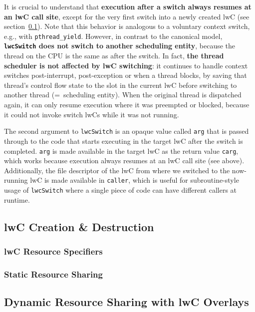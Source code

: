 \documentclass[10pt,twocolumn,letter]{article}
\begin{document}
It is crucial to understand that \textbf{execution after a switch always resumes at an lwC call site}, except for the very first switch into a newly created lwC (see section~\ref{design:createdestroy}).
Note that this behavior is analogous to a voluntary context switch, e.g., with \lstinline{pthread_yield}.
However, in contrast to the canonical model, \textbf{\lstinline{lwcSwitch} does not switch to another scheduling entity}, because the thread on the CPU is the same as after the switch.
In fact, \textbf{the thread scheduler is not affected by lwC switching}:
it continues to handle context switches post-interrupt, post-exception or when a thread blocks, by saving that thread's control flow state to the slot in the current lwC before switching to another thread (=~scheduling entity).
When the original thread is dispatched again, it can only resume execution where it was preempted or blocked, because it could not invoke switch lwCs while it was not running.

The second argument to \lstinline{lwcSwitch} is an opaque value called \lstinline{arg} that is passed through to the code that starts executing in the target lwC after the switch is completed.
\lstinline{arg} is made available in the target lwC as the return value \lstinline{carg}, which works because execution always resumes at an lwC call site (see above).
Additionally, the file descriptor of the lwC from where we switched to the now-running lwC is made available in \lstinline{caller}, which is useful for subroutine-style usage of \lstinline{lwcSwitch} where a single piece of code can have different callers at runtime.

\subsection{lwC Creation \& Destruction}\label{design:createdestroy}

\subsubsection{lwC Resource Specifiers}\label{design:rspecs}
\subsubsection{Static Resource Sharing}

\subsection{Dynamic Resource Sharing with lwC Overlays}\label{design:overlays}
\end{document}
